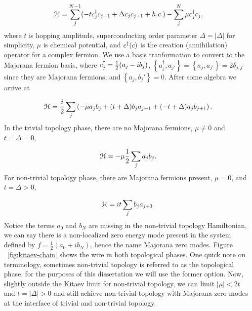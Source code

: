 \begin{equation}
  \mathcal{H} = \sum_j^{N-1} (-t c^{\dagger}_j c_{j+1} + \Delta c_j c_{j+1} + h.c.) - \sum_j^{N} \mu c^{\dagger}_j c_j,
\end{equation}
where $t$ is hopping amplitude, superconducting order parameter $\Delta = |\Delta|$ for simplicity, $\mu$ is chemical potential, and $c^{\dagger} (c)$ is the creation (annihilation) operator for a complex fermion.
We use a basis tranformation to convert to the Majorana fermion basis, where
$c^{\dagger}_j = \tfrac{1}{2} (a_j - i b_j)$, $\left\{ a^{\dagger}_j, a_{j'} \right\} = \left\{ a_j, a_{j'} \right\} = 2\delta_{j,j'}$
since they are Majorana fermions, and $\left\{a_j,b_j'\right\} = 0$.
After some algebra we arrive at

\begin{equation}
  \mathcal{H} = \dfrac{i}{2} \sum_j \left( -\mu a_j b_j + (t+\Delta) b_j a_{j+1} + (-t+\Delta) a_j b_{j+1} \right).
\end{equation}
In the trivial topology phase, there are no Majorana fermions, $\mu \neq 0$ and $t=\Delta=0$,

\begin{equation}
  \mathcal{H} = -\mu\dfrac{1}{2} \sum_j a_j b_j.
\end{equation}
For non-trivial topology phase, there are Majorana fermions present, $\mu = 0$, and $t = \Delta > 0$,

\begin{equation}
  \mathcal{H} = it \sum_j b_j a_{j+1}.
\end{equation}
Notice the terms $a_0$ and $b_N$ are missing in the non-trivial topology Hamiltonian, we can say there is a non-localized zero energy mode present in the system defined by $f = \tfrac{1}{2}(a_0 + i b_N)$, hence the name Majorana zero modes.
Figure ~\ref{fig:kitaev-chain} shows the wire in both topological phases.
One quick note on terminology, sometimes non-trivial topology is referred to as the topological phase, for the purposes of this dissertation we will use the former option.
Now, slightly outside the Kitaev limit for non-trivial topology, we can limit $|\mu| < 2t$ and $t = |\Delta| >0$ and still achieve non-trivial topology with Majorana zero modes at the interface of trivial and non-trivial topology.

